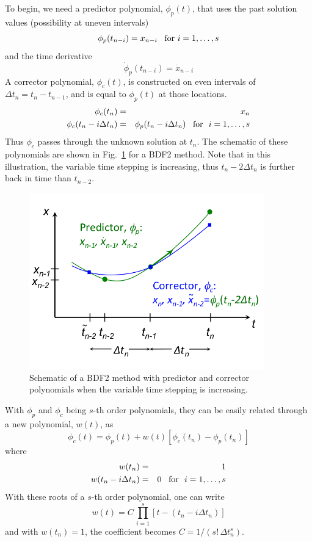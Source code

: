 To begin, we need a predictor polynomial, $\phi_{p}(t)$, that uses
the past solution values (possibility at uneven intervals)
\[
\phi_{p}(t_{n-i})=x_{n-i}\mbox{{\,\,\,\ for\,\,}}i=1,\ldots,s
\]
and the time derivative
\[
\dot{\phi}_{p}(t_{n-i})=\dot{x}_{n-i}
\]
A corrector polynomial, $\phi_{c}(t)$, is constructed on even intervals
of $\Delta t_{n}=t_{n}-t_{n-1}$, and is equal to $\phi_{p}(t)$ at
those locations. 
\begin{eqnarray*}
\phi_{c}(t_{n}) & = & x_{n}\\
\phi_{c}(t_{n}-i\Delta t_{n}) & = & \phi_{p}(t_{n}-i\Delta t_{n})\mbox{{\,\,\,\ for\,\,} }i=1,\ldots,s
\end{eqnarray*}
Thus $\phi_{c}$ passes through the unknown solution at $t_{n}$.
The schematic of these polynomials are shown in Fig.~\ref{rythmos:fig:BDF2-schematic}
for a BDF2 method. Note that in this illustration, the variable time
stepping is increasing, thus $t_{n}-2\Delta t_{n}$ is further back
in time than $t_{n-2}$.

\begin{figure}
\centering{}\includegraphics[width=4in]{figures/BDF2}\caption{Schematic of a BDF2 method with predictor and corrector polynomials
when the variable time stepping is increasing.\label{rythmos:fig:BDF2-schematic}}
\end{figure}


With $\phi_{p}$ and $\phi_{c}$ being $s$-th order polynomials,
they can be easily related through a new polynomial, $w(t)$, as
\begin{equation}
\phi_{c}(t)=\phi_{p}(t)+w(t)[\phi_{c}(t_{n})-\phi_{p}(t_{n})]\label{rythmos:eq:BDF-corrector}
\end{equation}
where
\begin{eqnarray*}
w(t_{n}) & = & 1\\
w(t_{n}-i\Delta t_{n}) & = & 0\mbox{{\,\,\,\ for\,\,} }i=1,\ldots,s
\end{eqnarray*}
With these roots of a $s$-th order polynomial, one can write
\[
w(t)=C\,\prod_{i=1}^{s}[t-(t_{n}-i\Delta t_{n})]
\]
and with $w(t_{n})=1$, the coefficient becomes $C=1/(s!\,\Delta t_{n}^{s})$.

